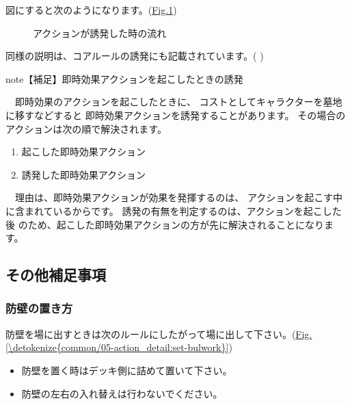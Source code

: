 \documentclass[letterpaper,10pt,dvipdfmx]{sphinxmanual}
\begin{document}
図にすると次のようになります。(\hyperref[\detokenize{common/05-action_detail:trigger}]{Fig.\@ \ref{\detokenize{common/05-action_detail:trigger}}})

\begin{figure}[htbp]
\centering
\capstart

\noindent{}
\caption{アクションが誘発した時の流れ}\label{\detokenize{common/05-action_detail:id17}}\label{\detokenize{common/05-action_detail:trigger}}\end{figure}

同様の説明は、コアルールの誘発にも記載されています。(  )

\begin{sphinxadmonition}{note}{【補足】即時効果アクションを起こしたときの誘発}

　即時効果のアクションを起こしたときに、
コストとしてキャラクターを墓地に移すなどすると
即時効果アクションを誘発することがあります。
その場合のアクションは次の順で解決されます。
\begin{enumerate}
%
\item {} 
起こした即時効果アクション

\item {} 
誘発した即時効果アクション

\end{enumerate}

　理由は、即時効果アクションが効果を発揮するのは、
アクションを起こす中に含まれているからです。
誘発の有無を判定するのは、アクションを起こした後
のため、起こした即時効果アクションの方が先に解決されることになります。
\end{sphinxadmonition}


\subsection{その他補足事項}
\label{\detokenize{common/05-action_detail:id12}}

\subsubsection{防壁の置き方}
\label{\detokenize{common/05-action_detail:id13}}
防壁を場に出すときは次のルールにしたがって場に出して下さい。(\hyperref[\detokenize{common/05-action_detail:set-bulwork}]{Fig.\@ \ref{\detokenize{common/05-action_detail:set-bulwork}}})
\begin{itemize}
\item {} 
防壁を置く時はデッキ側に詰めて置いて下さい。

\item {} 
防壁の左右の入れ替えは行わないでください。

\end{itemize}
\end{document}
